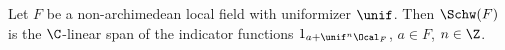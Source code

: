 Let $F$ be a non-archimedean local field with uniformizer $\unif$. Then $\Schw(F)$ is the $\C$-linear span of the
indicator functions $1_{a+\unif^n\Ocal_F}$, $a\in F$, $n\in\Z$.
